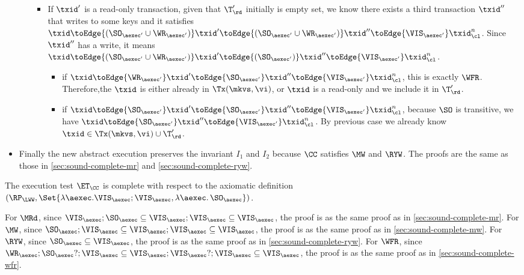 \begin{itemize}
\begin{itemize}
\begin{itemize}
        \item If \( \txid' \) is a read-only transaction,
        given that \( \T'_\rd \) initially is empty set,
        we know there exists a third transaction \( \txid'' \) that writes to some keys
        and it satisfies \( \txid \toEdge{( \SO_{\aexec'} \cup \WR_{\aexec'} )}  \txid' \toEdge{( \SO_{\aexec'} \cup \WR_{\aexec'} )}  \txid'' \toEdge{\VIS_{\aexec'}} \txid_\cl^n \).
        Since \( \txid'' \) has a write, it means 
        \( \txid \toEdge{( \SO_{\aexec'} \cup \WR_{\aexec'} )}  \txid' \toEdge{( \SO_{\aexec'} )}  \txid'' \toEdge{\VIS_{\aexec'}} \txid_\cl^n \).
        \begin{itemize}
            \item if \( \txid \toEdge{\WR_{\aexec'} }  \txid' \toEdge{ \SO_{\aexec'} }  \txid'' \toEdge{\VIS_{\aexec'}} \txid_\cl^n \),
            this is exactly \( \WFR \).
            Therefore,the \( \txid \) is either already in \( \Tx(\mkvs, \vi) \), 
            or \( \txid \) is a read-only and we include it in \( \T'_\rd \).

            \item if \( \txid \toEdge{\SO_{\aexec'} }  \txid' \toEdge{ \SO_{\aexec'} }  \txid'' \toEdge{\VIS_{\aexec'}} \txid_\cl^n \),
            because \( \SO \) is transitive, we have \( \txid \toEdge{\SO_{\aexec'}} \txid'' \toEdge{\VIS_{\aexec'}} \txid_\cl^n \).
            By previous case we already know \( \txid \in \Tx(\mkvs, \vi) \cup \T'_\rd \).
        \end{itemize}
    \end{itemize}
    \end{itemize}
    \item Finally the new abstract execution preserves the invariant \( I_1 \) and \( I_2 \) 
    because  \( \CC \) satisfies \( \MW \) and \( \RYW \).
    The proofs are the same as those in \cref{sec:sound-complete-mr} and \cref{sec:sound-complete-ryw}.

\end{itemize}

The execution test $\ET_\CC$ is complete with respect to the axiomatic definition 
\( (\RP_{\LWW}, \Set{\lambda \aexec. \VIS_{\aexec} ; \VIS_{\aexec}, \lambda \aexec \ldotp \SO_\aexec })\).

For \( \MRd \), since \(  \VIS_\aexec ; \SO_\aexec \subseteq  \VIS_\aexec ; \VIS_{\aexec} \subseteq \VIS_\aexec \),
the proof is as the same proof as in \cref{sec:sound-complete-mr}.
For \( \MW \), since \( \SO_\aexec ; \VIS_\aexec \subseteq  \VIS_\aexec ; \VIS_{\aexec} \subseteq \VIS_\aexec \),
the proof is as the same proof as in \cref{sec:sound-complete-mw}.
For \( \RYW \), since \( \SO_\aexec \subseteq \VIS_\aexec \),
the proof is as the same proof as in \cref{sec:sound-complete-ryw}.
For \( \WFR \), since \( \WR_\aexec ; \SO_\aexec? ; \VIS_\aexec \subseteq \VIS_\aexec ; \VIS_{\aexec}? ; \VIS_\aexec \subseteq \VIS_\aexec \),
the proof is as the same proof as in \cref{sec:sound-complete-wfr}.
